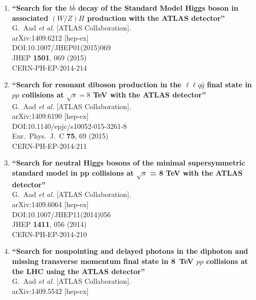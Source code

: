 \documentclass{article}
\begin{document}
\begin{enumerate}
\item%
{\bf ``Search for the $b\bar{b}$ decay of the Standard Model Higgs boson in associated $(W/Z)H$ production with the ATLAS detector''}
  \\{}G.~Aad {\it et al.} [ATLAS Collaboration].
  \\{}arXiv:1409.6212 [hep-ex]
  \\{}DOI:10.1007/JHEP01(2015)069
  \\{}JHEP {\bf 1501}, 069 (2015)
  \\{}CERN-PH-EP-2014-214
\item%
{\bf ``Search for resonant diboson production in the $\mathrm {\ell \ell }q\bar{q}$ final state in $pp$ collisions at $\sqrt{s} = 8$ TeV with the ATLAS detector''}
  \\{}G.~Aad {\it et al.} [ATLAS Collaboration].
  \\{}arXiv:1409.6190 [hep-ex]
  \\{}DOI:10.1140/epjc/s10052-015-3261-8
  \\{}Eur.\ Phys.\ J.\ C {\bf 75}, 69 (2015)
  \\{}CERN-PH-EP-2014-211
\item%
{\bf ``Search for neutral Higgs bosons of the minimal supersymmetric standard model in pp collisions at $\sqrt{s}$ = 8 TeV with the ATLAS detector''}
  \\{}G.~Aad {\it et al.} [ATLAS Collaboration].
  \\{}arXiv:1409.6064 [hep-ex]
  \\{}DOI:10.1007/JHEP11(2014)056
  \\{}JHEP {\bf 1411}, 056 (2014)
  \\{}CERN-PH-EP-2014-210
\item%
{\bf ``Search for nonpointing and delayed photons in the diphoton and missing transverse momentum final state in 8 TeV $pp$ collisions at the LHC using the ATLAS detector''}
  \\{}G.~Aad {\it et al.} [ATLAS Collaboration].
  \\{}arXiv:1409.5542 [hep-ex]

\end{enumerate}
\end{document}
